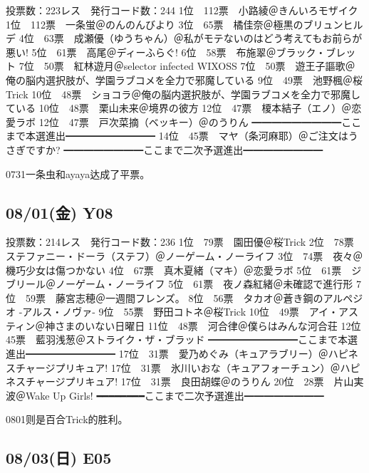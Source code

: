 	投票数：223レス　発行コード数：244
	1位　112票　小路綾＠きんいろモザイク
	1位　112票　一条蛍＠のんのんびより
	3位　65票　橘佳奈＠極黒のブリュンヒルデ
	4位　63票　成瀬優（ゆうちゃん）＠私がモテないのはどう考えてもお前らが悪い!
	5位　61票　高尾＠ディーふらぐ!
	6位　58票　布施翠＠ブラック・ブレット
	7位　50票　紅林遊月＠selector infected WIXOSS
	7位　50票　遊王子謳歌＠俺の脳内選択肢が、学園ラブコメを全力で邪魔している
	9位　49票　池野楓＠桜Trick
	10位　48票　ショコラ＠俺の脳内選択肢が、学園ラブコメを全力で邪魔している
	10位　48票　栗山未来＠境界の彼方
	12位　47票　榎本結子（エノ）＠恋愛ラボ
	12位　47票　戸次菜摘（ベッキー）＠のうりん
	━━━━━━━━━ここまで本選進出━━━━━━━━━
	14位　45票　マヤ（条河麻耶）＠ご注文はうさぎですか?
	━━━━━━━━ここまで二次予選進出━━━━━━━━

0731一条虫和ayaya达成了平票。

\subsection{08/01(金) Y08}

	投票数：214レス　発行コード数：236
	1位　79票　園田優＠桜Trick
	2位　78票　ステファニー・ドーラ（ステフ）＠ノーゲーム・ノーライフ
	3位　74票　夜々＠機巧少女は傷つかない
	4位　67票　真木夏緒（マキ）＠恋愛ラボ
	5位　61票　ジブリール＠ノーゲーム・ノーライフ
	5位　61票　夜ノ森紅緒＠未確認で進行形
	7位　59票　藤宮志穂＠一週間フレンズ。
	8位　56票　タカオ＠蒼き鋼のアルペジオ -アルス・ノヴァ-
	9位　55票　野田コトネ＠桜Trick
	10位　49票　アイ・アスティン＠神さまのいない日曜日
	11位　48票　河合律＠僕らはみんな河合荘
	12位　45票　藍羽浅葱＠ストライク・ザ・ブラッド
	━━━━━━━━━ここまで本選進出━━━━━━━━━
	17位　31票　愛乃めぐみ（キュアラブリー）＠ハピネスチャージプリキュア!
	17位　31票　氷川いおな（キュアフォーチュン）＠ハピネスチャージプリキュア!
	17位　31票　良田胡蝶＠のうりん
	20位　28票　片山実波＠Wake Up Girls!
	━━━━━━━━ここまで二次予選進出━━━━━━━━

0801则是百合Trick的胜利。

\subsection{08/03(日) E05}

